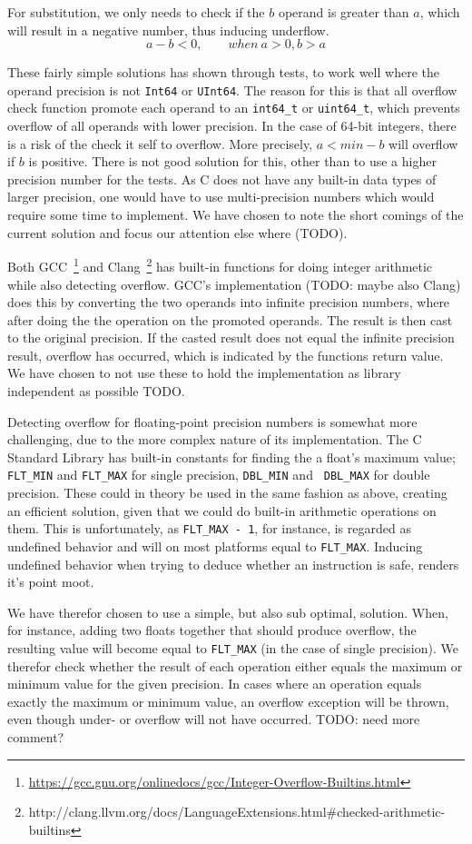 For substitution, we only needs to check if the $b$ operand is greater
than $a$, which will result in a negative number, thus inducing underflow.
\begin{equation}
  a - b < 0, \qquad when\ a > 0, b > a
\end{equation}

These fairly simple solutions has shown through tests, to work well where the
operand precision is not {\tt Int64} or {\tt UInt64}. The reason for this is
that all overflow check function promote each operand to an {\tt int64\_t} or
{\tt uint64\_t}, which prevents overflow of all operands with lower
precision. In the case of 64-bit integers, there is a risk of the check it self
to overflow. More precisely, $a < min - b$ will overflow if $b$ is
positive. There is not good solution for this, other than to use a higher
precision number for the tests. As C does not have any built-in data types of
larger precision, one would have to use multi-precision numbers which would
require some time to implement. We have chosen to note the short comings of the
current solution and focus our attention else where (TODO).

Both
GCC~\footnote{\url{https://gcc.gnu.org/onlinedocs/gcc/Integer-Overflow-Builtins.html}}
and
Clang~\footnote{http://clang.llvm.org/docs/LanguageExtensions.html\#checked-arithmetic-builtins}
has built-in functions for doing integer arithmetic while also detecting
overflow. GCC's implementation (TODO: maybe also Clang) does this by converting
the two operands into infinite precision numbers, where after doing the the
operation on the promoted operands. The result is then cast to the original
precision. If the casted result does not equal the infinite precision result,
overflow has occurred, which is indicated by the functions return value. We have
chosen to not use these to hold the implementation as library independent as
possible TODO.

Detecting overflow for floating-point precision numbers is somewhat more
challenging, due to the more complex nature of its implementation. The C
Standard Library has built-in constants for finding the a float's maximum value;
{\tt FLT\_MIN} and {\tt FLT\_MAX} for single precision, {\tt DBL\_MIN} and {\tt
  DBL\_MAX} for double precision. These could in theory be used in the same
fashion as above, creating an efficient solution, given that we could do
built-in arithmetic operations on them. This is unfortunately, as {\tt FLT\_MAX
  - 1}, for instance, is regarded as undefined behavior and will on most
platforms equal to {\tt FLT\_MAX}. Inducing undefined behavior when trying to
deduce whether an instruction is safe, renders it's point moot.

We have therefor chosen to use a simple, but also sub optimal, solution. When,
for instance, adding two floats together that should produce overflow, the
resulting value will become equal to {\tt FLT\_MAX} (in the case of single
precision). We therefor check whether the result of each operation either equals
the maximum or minimum value for the given precision. In cases where an
operation equals exactly the maximum or minimum value, an overflow exception
will be thrown, even though under- or overflow will not have occurred. TODO:
need more comment?
